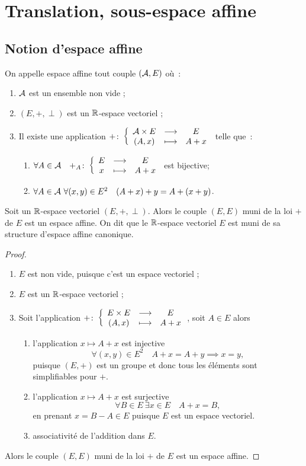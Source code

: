 \section{Translation, sous-espace affine}

\subsection{Notion d'espace affine}

\begin{defdef}
  On appelle espace affine tout couple $(\mathcal{A},E)$ où~:
  \begin{enumerate}
  \item $\mathcal{A}$ est un ensemble non vide ;
  \item $(E,+,\perp)$ est un $\mathbb{R}$-espace vectoriel ;
  \item Il existe une application $+\colon \left\{\begin{array}{ccc} \mathcal{A}\times E & \longrightarrow &E\\ (A,x) & \longmapsto & A+x \end{array} \right.$ telle que~:
    \begin{enumerate}
    \item $\forall A \in \mathcal{A} \quad +_A\colon \left\{\begin{array}{ccc} E & \longrightarrow &E\\ x & \longmapsto & A+x \end{array} \right.$ est bijective;
    \item $\forall A \in \mathcal{A} \ \forall (x,y) \in E^2 \quad (A+x)+y = A+(x+y)$.
    \end{enumerate}
  \end{enumerate}
\end{defdef}

\begin{prop}
  Soit un $\mathbb{R}$-espace vectoriel $(E,+,\perp)$. Alors le couple $(E,E)$ muni de la loi $+$ de $E$ est un espace affine. On dit que le $\mathbb{R}$-espace vectoriel $E$ est muni de sa structure d'espace affine canonique.
\end{prop}
\begin{proof}
  \begin{enumerate}
  \item $E$ est non vide, puisque c'est un espace vectoriel ;
  \item $E$ est un $\mathbb{R}$-espace vectoriel ;
  \item Soit l'application $+\colon \left\{\begin{array}{ccc} E\times E & \longrightarrow &E\\ (A,x) & \longmapsto & A+x \end{array} \right.$, soit $A \in E$ alors
    \begin{enumerate}
    \item l'application $x \longmapsto A+x$ est injective
      \begin{equation}
        \forall (x,y) \in E^2 \quad A+x=A+y \implies x=y,
      \end{equation}
      puisque $(E,+)$ est un groupe et donc tous les éléments sont simplifiables pour $+$.
    \item l'application $x \longmapsto A+x$ est surjective
      \begin{equation}
        \forall B \in E \ \exists x \in E \quad A+x=B, 
      \end{equation}
      en prenant $x=B-A \in E$ puisque $E$ est un espace vectoriel.
    \item associativité de l'addition dans $E$.
    \end{enumerate}
  \end{enumerate}
  Alors le couple $(E,E)$ muni de la loi $+$ de $E$ est un espace affine.
\end{proof}

